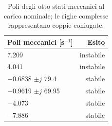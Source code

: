 \begin{table}[htbp]\centering\small
\setlength{\tabcolsep}{4pt}
\begin{tabular}{lr}\toprule
Poli meccanici [s$^{-1}$] & Esito\\\midrule
\num{7.209} & instabile\\
\num{4.041} & instabile\\
\num{-0.6838} $\pm j$ \num{79.4} & stabile\\
\num{-0.9619} $\pm j$ \num{69.95} & stabile\\
\num{-4.073} & stabile\\
\num{-7.886} & stabile\\
\bottomrule\end{tabular}
\caption{Poli degli otto stati meccanici al carico nominale; le righe complesse rappresentano coppie coniugate.}
\label{tab:poli}
\end{table}

